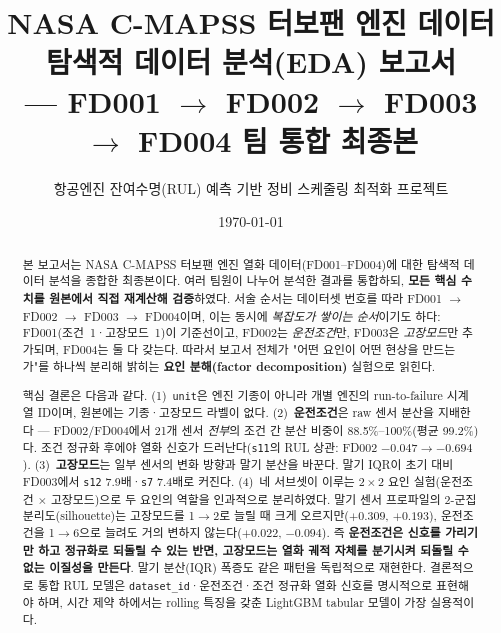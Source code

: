 \documentclass[11pt]{article}
\title{\textbf{NASA C-MAPSS 터보팬 엔진 데이터\\탐색적 데이터 분석(EDA) 보고서}\\[2pt]
\large — FD001 $\to$ FD002 $\to$ FD003 $\to$ FD004 팀 통합 최종본}
\author{항공엔진 잔여수명(RUL) 예측 기반 정비 스케줄링 최적화 프로젝트}
\date{\today}
\begin{document}
\maketitle

\begin{abstract}
\noindent
본 보고서는 NASA C-MAPSS 터보팬 엔진 열화 데이터(FD001--FD004)에 대한 탐색적 데이터 분석을 종합한 최종본이다.
여러 팀원이 나누어 분석한 결과를 통합하되, \textbf{모든 핵심 수치를 원본에서 직접 재계산해 검증}하였다.
서술 순서는 데이터셋 번호를 따라 FD001 $\to$ FD002 $\to$ FD003 $\to$ FD004이며, 이는 동시에 \emph{복잡도가 쌓이는 순서}이기도 하다:
FD001(조건~1·고장모드~1)이 기준선이고, FD002는 \emph{운전조건}만, FD003은 \emph{고장모드}만 추가되며, FD004는 둘 다 갖는다.
따라서 보고서 전체가 "어떤 요인이 어떤 현상을 만드는가"를 하나씩 분리해 밝히는 \textbf{요인 분해(factor decomposition)} 실험으로 읽힌다.

핵심 결론은 다음과 같다.
(1)~\texttt{unit}은 엔진 기종이 아니라 개별 엔진의 run-to-failure 시계열 ID이며, 원본에는 기종·고장모드 라벨이 없다.
(2)~\textbf{운전조건}은 raw 센서 분산을 지배한다 — FD002/FD004에서 21개 센서 \emph{전부}의 조건 간 분산 비중이 88.5\%--100\%(평균 99.2\%)다. 조건 정규화 후에야 열화 신호가 드러난다(\texttt{s11}의 RUL 상관: FD002 $-0.047 \to -0.694$).
(3)~\textbf{고장모드}는 일부 센서의 변화 방향과 말기 분산을 바꾼다. 말기 IQR이 초기 대비 FD003에서 \texttt{s12} 7.9배·\texttt{s7} 7.4배로 커진다.
(4)~네 서브셋이 이루는 $2\times2$ 요인 실험(운전조건 $\times$ 고장모드)으로 두 요인의 역할을 인과적으로 분리하였다.
말기 센서 프로파일의 2-군집 분리도(silhouette)는 고장모드를 1$\to$2로 늘릴 때 크게 오르지만($+0.309$, $+0.193$), 운전조건을 1$\to$6으로 늘려도 거의 변하지 않는다($+0.022$, $-0.094$).
즉 \textbf{운전조건은 신호를 가리기만 하고 정규화로 되돌릴 수 있는 반면, 고장모드는 열화 궤적 자체를 분기시켜 되돌릴 수 없는 이질성을 만든다}.
말기 분산(IQR) 폭증도 같은 패턴을 독립적으로 재현한다.
결론적으로 통합 RUL 모델은 \texttt{dataset\_id}·운전조건·조건 정규화 열화 신호를 명시적으로 표현해야 하며, 시간 제약 하에서는 rolling 특징을 갖춘 LightGBM tabular 모델이 가장 실용적이다.
\end{abstract}
\vspace{0.5em}
\begin{center}\end{center}
\vspace{0.5em}
\end{document}
